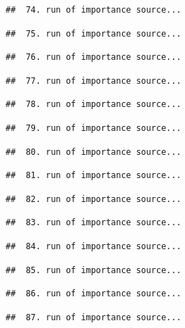 \documentclass[
]{article}
\begin{document}
\begin{verbatim}
##  74. run of importance source...
\end{verbatim}

\begin{verbatim}
##  75. run of importance source...
\end{verbatim}

\begin{verbatim}
##  76. run of importance source...
\end{verbatim}

\begin{verbatim}
##  77. run of importance source...
\end{verbatim}

\begin{verbatim}
##  78. run of importance source...
\end{verbatim}

\begin{verbatim}
##  79. run of importance source...
\end{verbatim}

\begin{verbatim}
##  80. run of importance source...
\end{verbatim}

\begin{verbatim}
##  81. run of importance source...
\end{verbatim}

\begin{verbatim}
##  82. run of importance source...
\end{verbatim}

\begin{verbatim}
##  83. run of importance source...
\end{verbatim}

\begin{verbatim}
##  84. run of importance source...
\end{verbatim}

\begin{verbatim}
##  85. run of importance source...
\end{verbatim}

\begin{verbatim}
##  86. run of importance source...
\end{verbatim}

\begin{verbatim}
##  87. run of importance source...
\end{verbatim}
\end{document}
